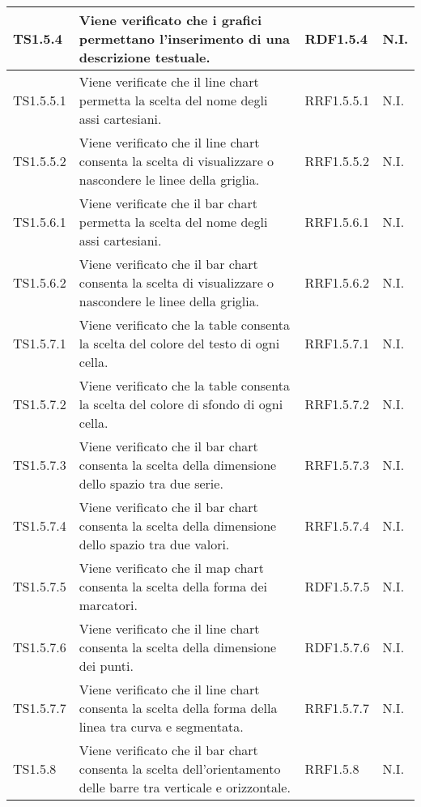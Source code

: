 \begin{longtabu}{| X[0.5] | X | X[0.5] | X[0.4] |}
TS1.5.4 & Viene verificato che i grafici permettano l'inserimento di una descrizione testuale. & RDF1.5.4 & N.I.\\ \hline

TS1.5.5.1 & Viene verificate che il line chart permetta la scelta del nome degli assi cartesiani. & RRF1.5.5.1 & N.I.\\ \hline

TS1.5.5.2 & Viene verificato che il line chart consenta la scelta di visualizzare o nascondere le linee della griglia.& RRF1.5.5.2 & N.I.\\ \hline

TS1.5.6.1 & Viene verificate che il bar chart permetta la scelta del nome degli assi cartesiani. & RRF1.5.6.1 & N.I.\\ \hline

TS1.5.6.2 &	Viene verificato che il bar chart consenta la scelta di visualizzare o nascondere le linee della griglia. & RRF1.5.6.2 & N.I.\\ \hline

TS1.5.7.1 & Viene verificato che la table consenta la scelta del colore del testo di ogni cella. & RRF1.5.7.1 & N.I.\\ \hline

TS1.5.7.2 & Viene verificato che la table consenta la scelta del colore di sfondo di ogni cella. & RRF1.5.7.2 & N.I.\\ \hline

TS1.5.7.3 & Viene verificato che il bar chart consenta la scelta della dimensione dello spazio tra due serie. & RRF1.5.7.3 & N.I.\\ \hline

TS1.5.7.4 & Viene verificato che il bar chart consenta la scelta della dimensione dello spazio tra due valori. & RRF1.5.7.4 & N.I.\\ \hline

TS1.5.7.5 & Viene verificato che il map chart consenta la scelta della forma dei marcatori. & RDF1.5.7.5 & N.I.\\ \hline

TS1.5.7.6 & Viene verificato che il line chart consenta la scelta della dimensione dei punti.&
RDF1.5.7.6 & N.I.\\ \hline

TS1.5.7.7 &	Viene verificato che il line chart consenta la scelta della forma della linea tra curva e segmentata. & RRF1.5.7.7 & N.I.\\ \hline

TS1.5.8 & Viene verificato che il bar chart consenta la scelta dell'orientamento delle barre tra verticale e orizzontale. & RRF1.5.8 & N.I.\\ \hline


\end{longtabu}
